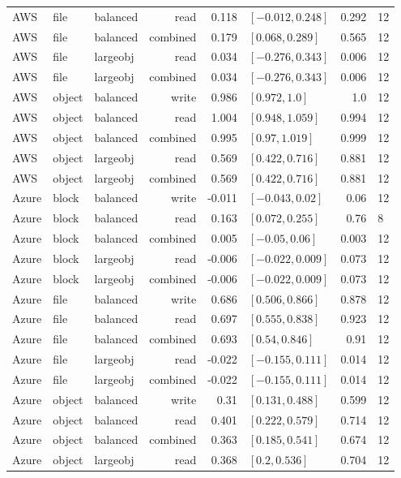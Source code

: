 \begin{tabular}{lllrrlrl}
AWS & file & balanced & read & 0.118 & $[-0.012, 0.248]$ & 0.292 & 12 \\
AWS & file & balanced & combined & 0.179 & $[0.068, 0.289]$ & 0.565 & 12 \\
AWS & file & largeobj & read & 0.034 & $[-0.276, 0.343]$ & 0.006 & 12 \\
AWS & file & largeobj & combined & 0.034 & $[-0.276, 0.343]$ & 0.006 & 12 \\
AWS & object & balanced & write & 0.986 & $[0.972, 1.0]$ & 1.0 & 12 \\
AWS & object & balanced & read & 1.004 & $[0.948, 1.059]$ & 0.994 & 12 \\
AWS & object & balanced & combined & 0.995 & $[0.97, 1.019]$ & 0.999 & 12 \\
AWS & object & largeobj & read & 0.569 & $[0.422, 0.716]$ & 0.881 & 12 \\
AWS & object & largeobj & combined & 0.569 & $[0.422, 0.716]$ & 0.881 & 12 \\
Azure & block & balanced & write & -0.011 & $[-0.043, 0.02]$ & 0.06 & 12 \\
Azure & block & balanced & read & 0.163 & $[0.072, 0.255]$ & 0.76 & 8 \\
Azure & block & balanced & combined & 0.005 & $[-0.05, 0.06]$ & 0.003 & 12 \\
Azure & block & largeobj & read & -0.006 & $[-0.022, 0.009]$ & 0.073 & 12 \\
Azure & block & largeobj & combined & -0.006 & $[-0.022, 0.009]$ & 0.073 & 12 \\
Azure & file & balanced & write & 0.686 & $[0.506, 0.866]$ & 0.878 & 12 \\
Azure & file & balanced & read & 0.697 & $[0.555, 0.838]$ & 0.923 & 12 \\
Azure & file & balanced & combined & 0.693 & $[0.54, 0.846]$ & 0.91 & 12 \\
Azure & file & largeobj & read & -0.022 & $[-0.155, 0.111]$ & 0.014 & 12 \\
Azure & file & largeobj & combined & -0.022 & $[-0.155, 0.111]$ & 0.014 & 12 \\
Azure & object & balanced & write & 0.31 & $[0.131, 0.488]$ & 0.599 & 12 \\
Azure & object & balanced & read & 0.401 & $[0.222, 0.579]$ & 0.714 & 12 \\
Azure & object & balanced & combined & 0.363 & $[0.185, 0.541]$ & 0.674 & 12 \\
Azure & object & largeobj & read & 0.368 & $[0.2, 0.536]$ & 0.704 & 12 \\

\end{tabular}
